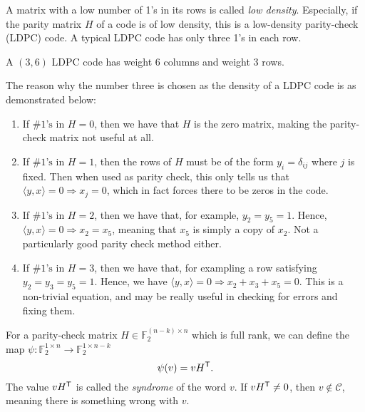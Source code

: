 \begin{definition}
    A matrix with a low number of 1's in its rows is called \textit{low density}. Especially, if the parity matrix $H$ of a code is of low density, this is a low-density parity-check (LDPC) code. A typical LDPC code has only three 1's in each row. 
\end{definition}
\begin{example}
    A $(3,6)$ LDPC code has weight 6 columns and weight 3 rows.
\end{example}
\begin{remark}
    The reason why the number three is chosen as the density of a LDPC code is as demonstrated below:
    \begin{enumerate}
        \item If $\#1\text{'s in }H = 0$, then we have that $H$ is the zero matrix, making the parity-check matrix not useful at all.
        \item If $\#1\text{'s in }H = 1$, then the rows of $H$ must be of the form $y_i = \delta_{ij}$ where $j$ is fixed. Then when used as parity check, this only tells us that $\langle y,x\rangle=0 \Rightarrow x_j=0$, which in fact forces there to be zeros in the code.
        \item If $\#1\text{'s in }H = 2$, then we have that, for example, $y_2=y_5=1$. Hence, $\langle y,x\rangle=0\Rightarrow x_2=x_5$, meaning that $x_5$ is simply a copy of $x_2$. Not a particularly good parity check method either.
        \item If $\#1\text{'s in }H = 3$, then we have that, for exampling a row satisfying $y_2=y_3=y_5=1$. Hence, we have $\langle y,x\rangle=0\Rightarrow x_2+x_3+x_5=0$. This is a non-trivial equation, and may be really useful in checking for errors and fixing them.
    \end{enumerate}
\end{remark}

\begin{definition}[Syndrome]
    For a parity-check matrix $H\in\mathbb{F}_2^{(n-k)\times n}$ which is full rank, we can define the map $\psi:\mathbb{F}_2^{1\times n}\rightarrow\mathbb{F}_2^{1\times n-k}$
    \begin{equation}
        \psi(v) = vH^{\mathsf{T}}.
    \end{equation}
    The value $vH^{\mathsf{T}}$ is called the \textit{syndrome} of the word $v$. If $vH^{\mathsf{T}}\neq0$, then $v\notin\mathcal{C}$, meaning there is something wrong with $v$.
\end{definition}

